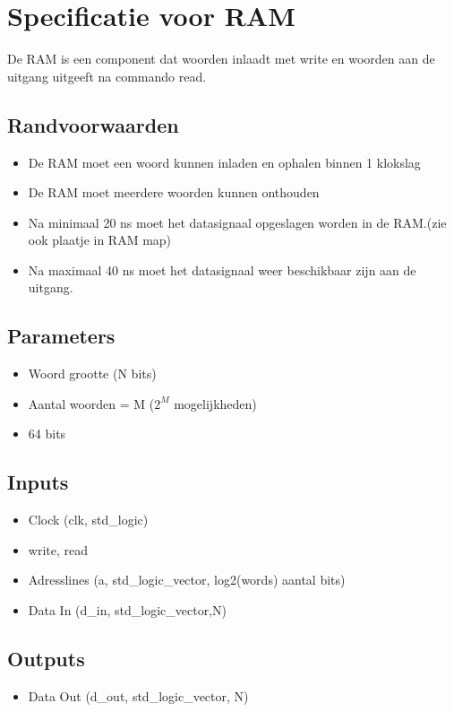 \documentclass{article}
\begin{document}
\section{Specificatie voor RAM}
De RAM is een component dat woorden inlaadt met write en woorden aan de uitgang uitgeeft na commando read. 
\subsection{Randvoorwaarden}
\begin{itemize}
\item De RAM moet een woord kunnen inladen en ophalen binnen 1 klokslag
\item De RAM moet meerdere woorden kunnen onthouden
\item Na minimaal 20 ns moet het datasignaal opgeslagen worden in de RAM.(zie ook plaatje in RAM map)
\item Na maximaal 40 ns moet het datasignaal weer beschikbaar zijn aan de uitgang.
\end{itemize}
\subsection{Parameters}
\begin{itemize}
\item Woord grootte (N bits)
\item Aantal woorden = M ($2^M$ mogelijkheden)
\item 64 bits

\end{itemize}
\subsection{Inputs}
\begin{itemize}
\item Clock (clk, std\_logic)
\item write, read
\item Adresslines (a, std\_logic\_vector, log2(words) aantal bits)
\item Data In (d\_in, std\_logic\_vector,N)
\end{itemize}
\subsection{Outputs}
\begin{itemize}
\item Data Out (d\_out, std\_logic\_vector, N)
\end{itemize}
\end{document}
